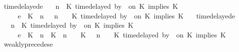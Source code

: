 \begin{isabellebody}
{\isacharbar}\ timedelayed{\isacharunderscore}e{}{\isacharcolon}\isanewline
\ \ {\isachardoublequoteopen}{\isacharparenleft}{\isasymGamma}{\isacharcomma}\ n\ {\isasymturnstile}\ {\isacharparenleft}{\isacharparenleft}K\ time{\isacharminus}delayed\ by\ {\isasymdelta}{\isasymtau}\ on\ K\ implies\ K\ {\isacharhash}\ {\isasymPsi}{\isacharparenright}\ {\isasymtriangleright}\ {\isasymPhi}{\isacharparenright}\isanewline
\ \ \ \ \ {\isasymhookrightarrow}\isactrlsub e\ \ {\isacharparenleft}{\isacharparenleft}{\isacharparenleft}K\ {\isasymnot}{\isasymUp}\ n{\isacharparenright}\ {\isacharhash}\ {\isasymGamma}{\isacharparenright}{\isacharcomma}\ n\ {\isasymturnstile}\ {\isasymPsi}\ {\isasymtriangleright}\ {\isacharparenleft}{\isacharparenleft}K\ time{\isacharminus}delayed\ by\ {\isasymdelta}{\isasymtau}\ on\ K\ implies\ K\ {\isacharhash}\ {\isasymPhi}{\isacharparenright}{\isacharparenright}{\isachardoublequoteclose}\isanewline
{\isacharbar}\ timedelayed{\isacharunderscore}e{}{\isacharcolon}\isanewline
\ \ {\isachardoublequoteopen}{\isacharparenleft}{\isasymGamma}{\isacharcomma}\ n\ {\isasymturnstile}\ {\isacharparenleft}{\isacharparenleft}K\ time{\isacharminus}delayed\ by\ {\isasymdelta}{\isasymtau}\ on\ K\ implies\ K\ {\isacharhash}\ {\isasymPsi}{\isacharparenright}\ {\isasymtriangleright}\ {\isasymPhi}{\isacharparenright}\isanewline
\ \ \ \ \ {\isasymhookrightarrow}\isactrlsub e\ \ {\isacharparenleft}{\isacharparenleft}{\isacharparenleft}K\ {\isasymUp}\ n{\isacharparenright}\ {\isacharhash}\ {\isacharparenleft}K\ {\isacharat}\ n\ {\isasymoplus}\ {\isasymdelta}{\isasymtau}\ {\isasymRightarrow}\ K\ {\isacharhash}\ {\isasymGamma}{\isacharparenright}{\isacharcomma}\ n\ {\isasymturnstile}\ {\isasymPsi}\ {\isasymtriangleright}\ {\isacharparenleft}{\isacharparenleft}K\ time{\isacharminus}delayed\ by\ {\isasymdelta}{\isasymtau}\ on\ K\ implies\ K\ {\isacharhash}\ {\isasymPhi}{\isacharparenright}{\isacharparenright}{\isachardoublequoteclose}\isanewline
{\isacharbar}\ weakly{\isacharunderscore}precedes{\isacharunderscore}e{\isacharcolon}\isanewline

\end{isabellebody}
